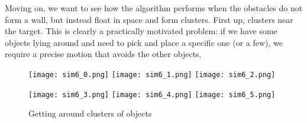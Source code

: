 



Moving on, we want to see how the algorithm performs when the obstacles do not form a wall, but instead float in space and form clusters. First up, clusters near the target. This is clearly a practically motivated problem: if we have some objects lying around and need to pick and place a specific one (or a few), we require a precise motion that avoids the other objects.

\begin{figure}[ht]
  \centering
  \begin{minipage}{0.85\textwidth}
    \texttt{[image: sim6\_0.png]}
    \texttt{[image: sim6\_1.png]}
    \texttt{[image: sim6\_2.png]}

    \texttt{[image: sim6\_3.png]}
    \texttt{[image: sim6\_4.png]}
    \texttt{[image: sim6\_5.png]}
  \end{minipage}
  \caption{Getting around clusters of objects}\label{fig:sim6}
\end{figure}

